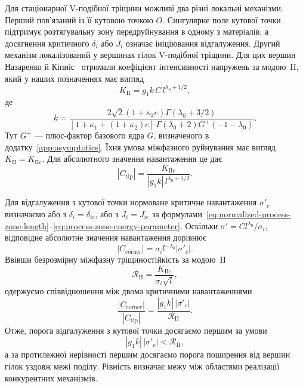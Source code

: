 Для стаціонарної V-подібної тріщини можливі два різні локальні механізми. Перший пов’язаний із її кутовою точкою $O$. Сингулярне поле кутової точки підтримує розтягувальну зону передруйнування в одному з матеріалів, а досягнення критичного $\delta_i$ або $J_i$ означає ініціювання відгалуження. Другий механізм локалізований у вершинах гілок V-подібної тріщини. Для цих вершин Назаренко й Кіпніс~\citeyearpar{NazarenkoKipnis2022Equilibrium} отримали коефіцієнт інтенсивності напружень за модою~II, який у наших позначеннях має вигляд
\begin{equation}
\label{eq:branch-tip-KII}
  K_{\mathrm{II}}
  =g_1 k\,C\,l^{\lambda_0+1/2},
\end{equation}
де
\begin{equation*}
  k=
  \frac{
    2\sqrt{2}(1+\kappa_2e)\Gamma(\lambda_0+3/2)
  }{
    [1+\kappa_1+(1+\kappa_2)e]\,
    \Gamma(\lambda_0+2)G^+(-1-\lambda_0)
  }.
\end{equation*}
Тут $G^+$ — плюс-фактор базового ядра $G$, визначеного в додатку~\ref{app:asymptotics}. Їхня умова міжфазного руйнування має вигляд $K_{\mathrm{II}}=K_{\mathrm{IIc}}$. Для абсолютного значення навантаження це дає
\begin{equation*}
  |C_{\mathrm{tip}}|
  =
  \frac{K_{\mathrm{IIc}}}
  {|g_1k|\,l^{\lambda_0+1/2}}.
\end{equation*}

Для відгалуження з кутової точки нормоване критичне навантаження $\sigma'_c$ визначаємо або з $\delta_i=\delta_{i\mathrm{c}}$, або з $J_i=J_{i\mathrm{c}}$ за формулами~\eqref{eq:normalized-process-zone-length}--\eqref{eq:process-zone-energy-parameter}. Оскільки $\sigma'=Cl^{\lambda_0}/\sigma_i$, відповідне абсолютне значення навантаження дорівнює
\begin{equation*}
  |C_{\mathrm{corner}}|
  =
  \sigma_i l^{-\lambda_0}|\sigma'_c|.
\end{equation*}
Ввівши безрозмірну міжфазну тріщиностійкість за модою~II
\begin{equation*}
  \mathcal R_{\mathrm{II}}
  =
  \frac{K_{\mathrm{IIc}}}{\sigma_i\sqrt{l}},
\end{equation*}
одержуємо співвідношення між двома критичними навантаженнями
\begin{equation}
\label{eq:mechanism-competition-ratio}
  \frac{|C_{\mathrm{corner}}|}{|C_{\mathrm{tip}}|}
  =
  \frac{|g_1k|\,|\sigma'_c|}{\mathcal R_{\mathrm{II}}}.
\end{equation}
Отже, порога відгалуження з кутової точки досягаємо першим за умови
\begin{equation*}
  |g_1k|\,|\sigma'_c|<\mathcal R_{\mathrm{II}},
\end{equation*}
а за протилежної нерівності першим досягаємо порога поширення від вершин гілок уздовж межі поділу. Рівність визначає межу між областями реалізації конкурентних механізмів.

